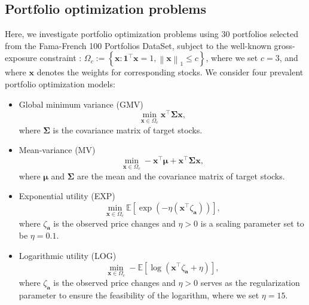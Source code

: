 \documentclass[aos]{imsart}
\numberwithin{equation}{section}
\theoremstyle{plain}
\begin{document}
\subsection{Portfolio optimization problems}
Here, we investigate portfolio optimization problems using $30$ portfolios selected from the Fama-French 100 Portfolios DataSet, subject to the well-known gross-exposure constraint \cite{Fan2012Vast}:
$\Omega_{c} := \left\{\bm{x}: \bm{1}^{\top} \bm{x} = 1, \left\| \bm{x} \right\|_1 \leq c\right\}$,
where we set $c =3$, and where $\bm{x}$ denotes the weights for corresponding stocks. We consider four prevalent portfolio optimization models:
\begin{itemize}
        \item Global minimum variance (GMV)
        \begin{equation*}
            \min_{\bm{x} \in \Omega_c} \bm{x}^{\top} \bm{\Sigma} \bm{x},
        \end{equation*}
        where $\bm{\Sigma}$ is the covariance matrix of target stocks.

        \item Mean-variance (MV)
        \begin{equation*}
            \min_{\bm{x} \in \Omega_c}  -\bm{x}^{\top}\bm{\mu} + \bm{x}^{\top} \bm{\Sigma} \bm{x},
        \end{equation*}
        where $\bm{\mu}$ and $\bm{\Sigma}$ are the mean and the covariance matrix of target stocks.

        \item Exponential utility (EXP)
        \begin{equation*}
            \min_{\bm{x} \in \Omega_c} \mathbb{E} \left[ \exp \left(-\eta \left(\bm{x}^{\top} \zeta_{\bm{a}} \right)\right) \right],
        \end{equation*}
        where $\zeta_{\bm{a}}$ is the observed price changes and $\eta>0$ is a scaling parameter set to be $\eta= 0.1$.

        \item Logarithmic utility (LOG) 
        \begin{equation*}
            \min_{\bm{x} \in \Omega_c}  -\mathbb{E} \left[ \log \left( \bm{x}^{\top} \zeta_{\bm{a}}+ \eta \right)  \right],
        \end{equation*}
        where $\zeta_{\bm{a}}$ is the observed price changes and $\eta>0$ serves as the regularization parameter to ensure the feasibility of the logarithm, where we set $\eta=15$.
    \end{itemize}
\end{document}
